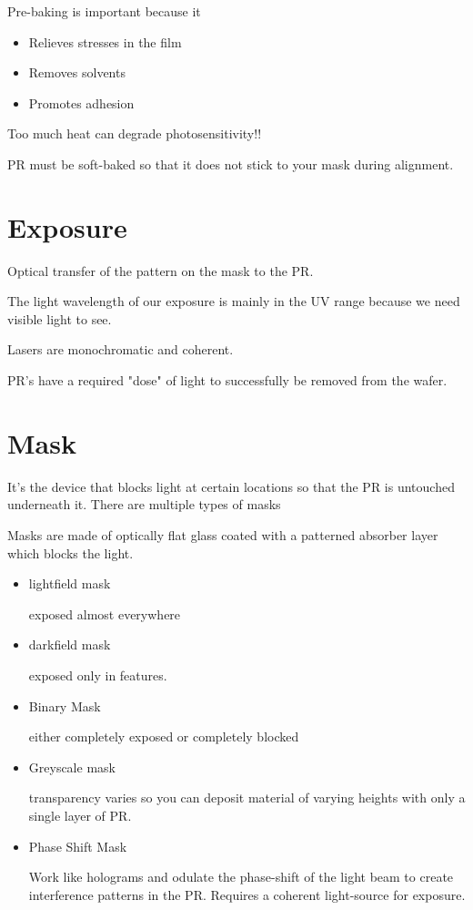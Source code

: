 \documentclass[fleqn]{report}
\begin{document}
Pre-baking is important because it 
\begin{itemize}
    \item 
    Relieves stresses in the film
    \item 
    Removes solvents
    \item 
    Promotes adhesion
\end{itemize}

Too much heat can degrade photosensitivity!! 

PR must be soft-baked so that it does not stick to your mask during alignment.

\section{Exposure}
Optical transfer of the pattern on the mask to the PR. 

The light wavelength of our exposure is mainly in the UV range because we 
need visible light to see. 

Lasers are monochromatic and coherent. 

PR's have a required "dose" of light to successfully be removed from the wafer. 

\section{Mask}
It's the device that blocks light at certain locations so that the PR 
is untouched underneath it. There are multiple types of masks 

Masks are made of optically flat glass coated with a patterned 
absorber layer which blocks the light.

\begin{itemize}
    \item
    lightfield mask

    exposed almost everywhere
    \item
    darkfield mask

    exposed only in features.
    \item 
    Binary Mask 

    either completely exposed or completely blocked 
    \item 
    Greyscale mask
    
    transparency varies so you can deposit material of varying 
    heights with only a single layer of PR. 
    \item 
    Phase Shift Mask 

    Work like holograms and odulate the phase-shift of the 
    light beam to create interference patterns in the 
    PR. Requires a coherent light-source for exposure. 
\end{itemize}
\end{document}

